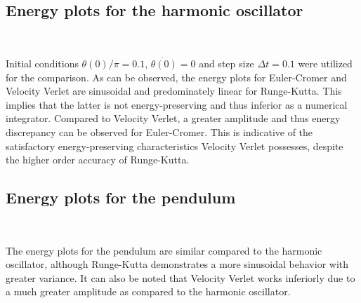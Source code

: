 \documentclass[12pt]{article}
\begin{document}
\newpage
\subsection*{Energy plots for the harmonic oscillator}
\begin{figure*}[ht!]
\begin{center}
   \\
   \caption{\label{workflow}. (a) Euler Cromer; 
   (b) Runge-Kutta; 
   (c) Velocity Verlet}
\end{center}
\end{figure*}
\noindent Initial conditions  $\theta(0)/\pi = 0.1$,  $\dot{\theta(0)} = 0$ and step size $\Delta t = 0.1$ were utilized for the comparison. As can be observed, the energy plots for Euler-Cromer and Velocity Verlet are sinusoidal and predominately linear for Runge-Kutta. This implies that the latter is not energy-preserving and thus  inferior as a numerical integrator. Compared to Velocity Verlet, a greater amplitude and thus energy discrepancy can be observed for Euler-Cromer. This is indicative of the satisfactory energy-preserving characteristics Velocity Verlet possesses, despite the higher order accuracy of Runge-Kutta.
\subsection*{Energy plots for the pendulum}
\begin{figure*}[ht!]
\begin{center}
   \\
   \caption{\label{workflow}
   (a) Euler Cromer; 
   (b) Runge-Kutta; 
   (c) Velocity Verlet}
\end{center}
\end{figure*}
\noindent The energy plots for the pendulum are similar compared to the harmonic oscillator, although Runge-Kutta demonstrates a more sinusoidal behavior with greater variance. 
It can also be noted that Velocity Verlet works  inferiorly due to a much greater amplitude as compared to the harmonic oscillator.
\end{document}
